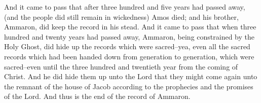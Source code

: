 And it came to pass that after three hundred and five years had passed away, (and the people did still remain in wickedness) Amos died; and his brother, Ammaron, did keep the record in his stead.
\bverse \iffalse And it came to pass that when three hundred and twenty years had passed away, Ammaron, being constrained by the Holy Ghost, did hide up the records which were sacred--yea, even all the sacred records which had been handed down from generation to generation, which were sacred--even until the three hundred and twentieth year from the coming of Christ. \fi
And it came to pass that when three hundred and twenty years had passed away, Ammaron, being constrained by the Holy Ghost, did hide up the records which were sacred--yea, even all the sacred records which had been handed down from generation to generation, which were sacred--even until the three hundred and twentieth year from the coming of Christ.
\bverse \iffalse And he did hide them up unto the Lord that they might come again unto the remnant of the house of Jacob according to the prophecies and the promises of the Lord. And thus is the end of the record of Ammaron. \fi
And he did hide them up unto the Lord that they might come again unto the remnant of the house of Jacob according to the prophecies and the promises of the Lord. And thus is the end of the record of Ammaron.
